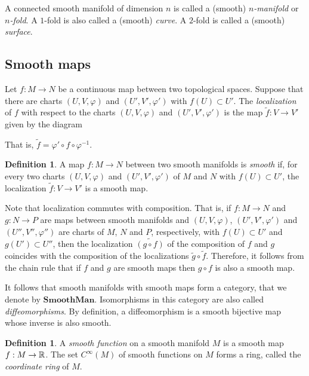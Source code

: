 \documentclass[11pt,a4paper]{book}
\theoremstyle{remark} \newtheorem{rmk}[thm]{Remark}
\theoremstyle{definition} \newtheorem{defn}[thm]{Definition}
\theoremstyle{definition} \newtheorem{ex}[thm]{Example}
\theoremstyle{definition} \newtheorem{ej}[thm]{Exercise}
\begin{document}
A connected smooth manifold of dimension $n$ is called a (smooth) \emph{$n$-manifold} or \emph{$n$-fold}. A $1$-fold is also called a (smooth) \emph{curve}. A $2$-fold is called a (smooth) \emph{surface}.

\subsection{Smooth maps}
Let $f:M\rightarrow N$ be a continuous map between two topological spaces. Suppose that there are charts $(U,V,\varphi)$ and $(U',V',\varphi')$ with $f(U)\subset U'$. The \emph{localization} of $f$ with respect to the charts $(U,V,\varphi)$ and $(U',V',\varphi')$ is the map $\tilde{f}: V \rightarrow V'$ given by the diagram
\begin{center}
\end{center}
That is, $\tilde{f}=\varphi'\circ f \circ \varphi^{-1}$.

\begin{defn}
A map $f:M\rightarrow N$ between two smooth manifolds is \emph{smooth} if, for every two charts $(U,V,\varphi)$ and $(U',V',\varphi')$ of $M$ and $N$ with $f(U)\subset U'$, the localization $\tilde{f}:V\rightarrow V'$ is a smooth map.
\end{defn}

Note that localization commutes with composition. That is, if $f:M\rightarrow N$ and $g:N\rightarrow P$ are maps between smooth manifolds and $(U,V,\varphi)$, $(U',V',\varphi')$ and $(U'',V'',\varphi'')$ are charts of $M$, $N$ and $P$, respectively, with $f(U)\subset U'$ and $g(U')\subset U''$, then the localization $\widetilde{(g\circ f)}$ of the composition of $f$ and $g$ coincides with the composition of the localizations $\tilde{g}\circ \tilde{f}$. Therefore, it follows from the chain rule that if $f$ and $g$ are smooth maps then $g\circ f$ is also a smooth map.

It follows that smooth manifolds with smooth maps form a category, that we denote by $\mathbf{SmoothMan}$. Isomorphisms in this category are also called \emph{diffeomorphisms}. By definition, a diffeomorphism is a smooth bijective map whose inverse is also smooth.

\begin{defn}
A \emph{smooth function} on a smooth manifold $M$ is a smooth map $f:M\rightarrow \mathbb R$. The set $C^\infty(M)$ of smooth functions on $M$ forms a ring, called the \emph{coordinate ring} of $M$.
\end{defn}
\end{document}
